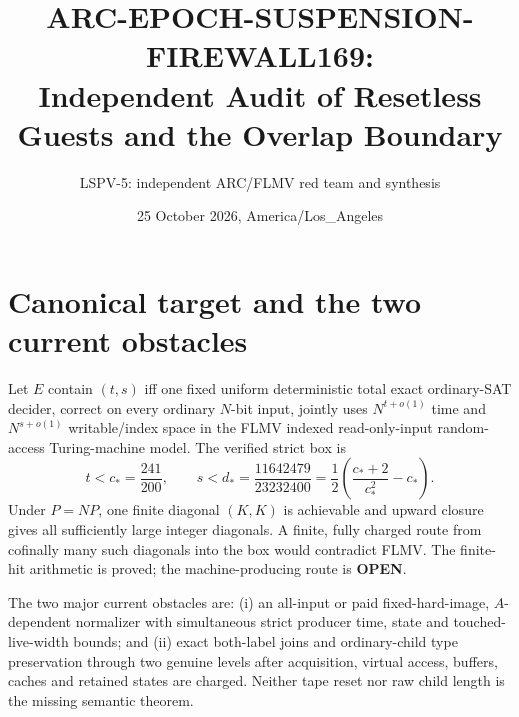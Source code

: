 \documentclass[11pt]{article}
\title{ARC-EPOCH-SUSPENSION-FIREWALL169:\\
Independent Audit of Resetless Guests and the Overlap Boundary}
\author{LSPV-5: independent ARC/FLMV red team and synthesis}
\date{25 October 2026, America/Los\_Angeles}
\newcommand{\OPEN}{\textbf{OPEN}}
\begin{document}
\maketitle

\begin{center}
\end{center}

\section{Canonical target and the two current obstacles}
Let $E$ contain $(t,s)$ iff one fixed uniform deterministic total exact
ordinary-SAT decider, correct on every ordinary $N$-bit input, jointly uses
$N^{t+o(1)}$ time and $N^{s+o(1)}$ writable/index space in the FLMV indexed
read-only-input random-access Turing-machine model.  The verified strict box is
\[
 t<c_*=\frac{241}{200},\qquad
 s<d_*=\frac{11642479}{23232400}
 =\frac12\left(\frac{c_*+2}{c_*^2}-c_*\right).
\]
Under $P=NP$, one finite diagonal $(K,K)$ is achievable and upward closure
gives all sufficiently large integer diagonals.  A finite, fully charged route
from cofinally many such diagonals into the box would contradict FLMV.  The
finite-hit arithmetic is proved; the machine-producing route is \OPEN.

The two major current obstacles are: (i) an all-input or paid fixed-hard-image,
$A$-dependent normalizer with simultaneous strict producer time, state and
touched-live-width bounds; and (ii) exact both-label joins and ordinary-child
type preservation through two genuine levels after acquisition, virtual
access, buffers, caches and retained states are charged.  Neither tape reset
nor raw child length is the missing semantic theorem.
\end{document}
